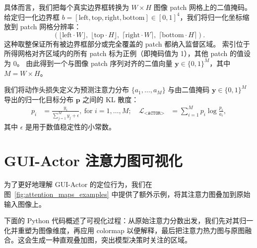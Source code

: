 \documentclass{article}
\begin{document}
具体而言，我们把每个真实边界框转换为 $W \times H$ 图像 patch 网格上的二值掩码。
给定归一化边界框 $b = [\text{left}, \text{top}, \text{right}, \text{bottom}] \in [0,1]^4$，我们将归一化坐标缩放到 patch 网格分辨率：
\begin{equation}
\left( \lfloor \text{left} \cdot W \rfloor,\; \lfloor \text{top} \cdot H \rfloor,\; \lceil \text{right} \cdot W \rceil,\; \lceil \text{bottom} \cdot H \rceil \right).
\end{equation}
这种取整保证所有被边界框部分或完全覆盖的 patch 都纳入监督区域。
索引位于所得网格对齐区域内的所有 patch 标为正例（即掩码值为 1），其他 patch 的值设为 0。
由此得到一个与图像 patch 序列对齐的二值向量 $\mathbf{y} \in \{0, 1\}^M$，其中 $M = W \times H$。

我们将动作头损失定义为预测注意力分布 $\{a_1, \dots, a_M\}$ 与由二值掩码 $\mathbf{y} \in \{0, 1\}^M$ 导出的归一化目标分布 $\mathbf{p}$ 之间的 KL 散度：
\begin{equation}
\begin{aligned}
\displaystyle p_i &= \frac{y_i}{\sum_{j=1}^M y_j + \epsilon}, \: \text{for } i = 1, \dots, M; \quad
\displaystyle \mathcal{L}_{\texttt{<ACTOR>}} &= \sum_{i=1}^M p_i \log \frac{p_i}{a_i},
\end{aligned}
\end{equation}
其中 $\epsilon$ 是用于数值稳定性的小常数。

\section{GUI-Actor 注意力图可视化}
\label{app:attention_maps}
为了更好地理解 GUI-Actor 的定位行为，我们在图~\ref{fig:attention_maps_examples} 中提供了额外示例，将其注意力图叠加到原始输入图像上。

下面的 Python 代码概述了可视化过程：从原始注意力分数出发，我们先对其归一化并重塑为图像维度，再应用 colormap 以便解释，最后把注意力热力图与原图融合。这会生成一种直观叠加图，突出模型决策时关注的区域。
\end{document}

